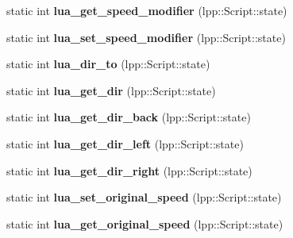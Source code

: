 \begin{DoxyCompactItemize}
\item 
static int {\bfseries lua\+\_\+get\+\_\+speed\+\_\+modifier} (lpp\+::\+Script\+::state)\hypertarget{class_lua_interface_ae3832a3801f2913d076977ece409c7f9}{}\label{class_lua_interface_ae3832a3801f2913d076977ece409c7f9}

\item 
static int {\bfseries lua\+\_\+set\+\_\+speed\+\_\+modifier} (lpp\+::\+Script\+::state)\hypertarget{class_lua_interface_a8039f318d7e9387d7c397da28f276363}{}\label{class_lua_interface_a8039f318d7e9387d7c397da28f276363}

\item 
static int {\bfseries lua\+\_\+dir\+\_\+to} (lpp\+::\+Script\+::state)\hypertarget{class_lua_interface_ab486d6477d30c6215dac967fb845c6f5}{}\label{class_lua_interface_ab486d6477d30c6215dac967fb845c6f5}

\item 
static int {\bfseries lua\+\_\+get\+\_\+dir} (lpp\+::\+Script\+::state)\hypertarget{class_lua_interface_a0979d3529a810cc3ae0037f485de1ef9}{}\label{class_lua_interface_a0979d3529a810cc3ae0037f485de1ef9}

\item 
static int {\bfseries lua\+\_\+get\+\_\+dir\+\_\+back} (lpp\+::\+Script\+::state)\hypertarget{class_lua_interface_a0ddd472cb4d8e12b4ca3c06190da771e}{}\label{class_lua_interface_a0ddd472cb4d8e12b4ca3c06190da771e}

\item 
static int {\bfseries lua\+\_\+get\+\_\+dir\+\_\+left} (lpp\+::\+Script\+::state)\hypertarget{class_lua_interface_aae9697d7bc54bd645b63c5266349c425}{}\label{class_lua_interface_aae9697d7bc54bd645b63c5266349c425}

\item 
static int {\bfseries lua\+\_\+get\+\_\+dir\+\_\+right} (lpp\+::\+Script\+::state)\hypertarget{class_lua_interface_aea3c5b084e1c25ace5987075436c20dc}{}\label{class_lua_interface_aea3c5b084e1c25ace5987075436c20dc}

\item 
static int {\bfseries lua\+\_\+set\+\_\+original\+\_\+speed} (lpp\+::\+Script\+::state)\hypertarget{class_lua_interface_a844ff6f3d8bffdd65ee683d7168e4f69}{}\label{class_lua_interface_a844ff6f3d8bffdd65ee683d7168e4f69}

\item 
static int {\bfseries lua\+\_\+get\+\_\+original\+\_\+speed} (lpp\+::\+Script\+::state)\hypertarget{class_lua_interface_aa944c5d44e61f190387427a783f43c67}{}\label{class_lua_interface_aa944c5d44e61f190387427a783f43c67}


\end{DoxyCompactItemize}
